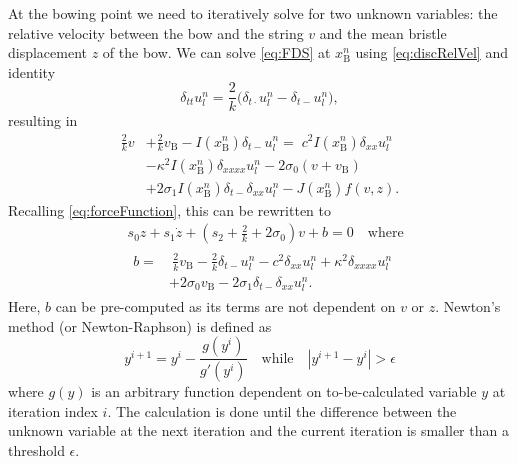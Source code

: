 \documentclass[twoside,a4paper]{article}
\begin{document}

At the bowing point we need to iteratively solve for two unknown variables: the relative velocity between the bow and the string $v$ and the mean bristle displacement $z$ of the bow.
We can solve \eqref{eq:FDS} at $x_\text{B}^n$ using \eqref{eq:discRelVel} and identity \cite{Bilbao2009}
\begin{equation}
    \delta_{tt}u_l^n = \frac{2}{k}\big(\delta_{t\cdot}u_l^n-\delta_{t-}u_l^n\big),
\end{equation}
resulting in 
\begin{equation}
\label{eq:stiffStringFDS}
\begin{aligned}
\frac{2}{k}v &+ \frac{2}{k}v_\text{B} - I(x_\text{B}^n) \delta_{t-}u_l^n = \; c^2 I(x_\text{B}^n)\delta_{xx} u_l^n \\
&-\kappa^2I(x_\text{B}^n)\delta_{xxxx} u_l^n - 2\sigma_0(v
+ v_\text{B})\\
&+ 2\sigma_1I(x_\text{B}^n)\delta_{t-}\delta_{xx}u_l^n - J(x_\text{B}^n)f(v, z).
\end{aligned}
\end{equation}
Recalling \eqref{eq:forceFunction}, this can be rewritten to
\begin{align}\label{eq:newtonFunction}
    &s_0z+s_1\dot z+(s_2 + \frac{2}{k} + 2\sigma_0)v + b = 0 \quad \text{where} \\
    & \begin{aligned}b =& \: \frac{2}{k}v_\text{B}-\frac{2}{k}\delta_{t-}u_l^n - c^2 \delta_{xx} u_l^n +\kappa^2\delta_{xxxx} u_l^n \\
    &+ 2\sigma_0v_\text{B}
- 2\sigma_1\delta_{t-}\delta_{xx}u_l^n.
\end{aligned}
\end{align}
Here, $b$ can be pre-computed as its terms are not dependent on $v$ or $z$.
Newton's method (or Newton-Raphson) is defined as
\begin{equation}
    y^{i+1} = y^{i} - \frac{g(y^i)}{g'(y^i)} \quad \text{while} \quad |y^{i+1}-y^i| > \epsilon
\end{equation}
where $g(y)$ is an arbitrary function dependent on to-be-calculated variable $y$ at iteration index $i$. The calculation is done until the difference between the unknown variable at the next iteration and the current iteration is smaller than a threshold $\epsilon$.
\end{document}
